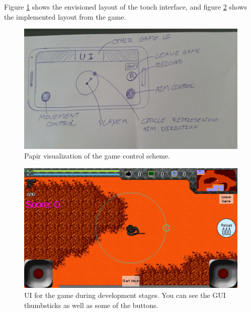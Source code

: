 Figure \ref{sec:modules:controlscheme:prototype} shows the envisioned layout of the touch interface, and figure \ref{sec:modules:controlscheme:touch:controls:ui} shows the implemented layout from the game.
\begin{figure}[H]
\centering
\includegraphics[width=.75\textwidth]{figures/controlscheme/prototype}
\caption{Papir visualization of the game control scheme.}
\label{sec:modules:controlscheme:prototype}
\end{figure}

\begin{figure}[H]
\centering
\includegraphics[width=.75\textwidth]{figures/controlscheme/ui}
\caption{UI for the game during development stages. You can see the GUI thumbsticks as well as some of the buttons.}
\label{sec:modules:controlscheme:touch:controls:ui}
\end{figure}
